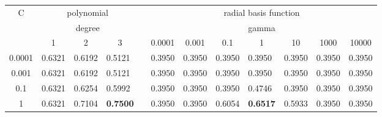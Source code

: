 \documentclass[a4paper]{llncs}
\begin{document}
\begin{table}[!htbp]
\centering
\begin{tabular}{|c|lll|l|lllllll|}
\cline{1-4} \cline{6-12}
\multirow{3}{*}{C} & \multicolumn{3}{c|}{polynomial}                                                &                       & \multicolumn{7}{c|}{radial basis function}                                                                                                                                                      \\ \cline{2-4} \cline{6-12} 
                   & \multicolumn{3}{c|}{degree}                                              &                       & \multicolumn{7}{c|}{gamma}                                                                                                                                                                      \\ %
                   & \multicolumn{1}{c}{1} & \multicolumn{1}{c}{2} & \multicolumn{1}{c|}{3} & \multicolumn{1}{c|}{} & \multicolumn{1}{c}{0.0001} & \multicolumn{1}{c}{0.001} & \multicolumn{1}{c}{0.1} & \multicolumn{1}{c}{1} & \multicolumn{1}{c}{10} & \multicolumn{1}{c}{1000} & \multicolumn{1}{c|}{10000} \\ \cline{1-4} \cline{6-12} 
0.0001             & 0.6321                 & 0.6192                 & 0.5121                 &                       & 0.3950                      & 0.3950                     & 0.3950                   & 0.3950                 & 0.3950                  & 0.3950                    & 0.3950                     \\ %
0.001              & 0.6321                 & 0.6192                 & 0.5121                 &                       & 0.3950                      & 0.3950                     & 0.3950                   & 0.3950                 & 0.3950                  & 0.3950                    & 0.3950                     \\ %
0.1                & 0.6321                 & 0.6254                 & 0.5992                 &                       & 0.3950                      & 0.3950                     & 0.3950                   & 0.4746                 & 0.3950                  & 0.3950                    & 0.3950                     \\ %
1                  & 0.6321                 & 0.7104                 & \textbf{0.7500}        &                       & 0.3950                      & 0.3950                     & 0.6054                   & \textbf{0.6517}        & 0.5933                  & 0.3950                    & 0.3950                     \\ %

\end{tabular}
\end{table}
\end{document}
